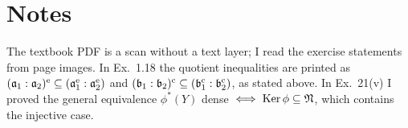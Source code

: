 \documentclass[11pt]{article}
\begin{document}
\section*{Notes}
The textbook PDF is a scan without a text layer; I read the exercise statements from page images. In Ex.~1.18 the quotient inequalities are printed as $(\mathfrak a_1:\mathfrak a_2)^{\mathrm{e}}\subseteq(\mathfrak a_1^{\mathrm{e}}:\mathfrak a_2^{\mathrm{e}})$ and $(\mathfrak b_1:\mathfrak b_2)^{\mathrm{c}}\subseteq(\mathfrak b_1^{\mathrm{c}}:\mathfrak b_2^{\mathrm{c}})$, as stated above. In Ex.~21(v) I proved the general equivalence $\phi^*(Y)$ dense $\iff\operatorname{Ker}\phi\subseteq\mathfrak N$, which contains the injective case.
\end{document}
